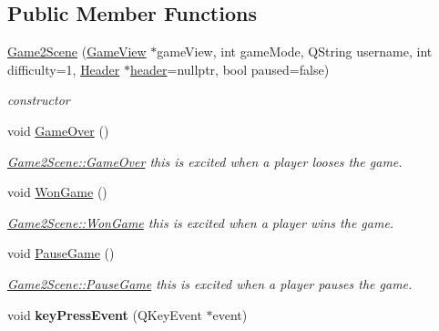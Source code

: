 \subsection*{Public Member Functions}
\begin{DoxyCompactItemize}
\item 
\hyperlink{classGame2Scene_a3e7775376b16bb0e7870b4a4ebe50b06}{Game2\-Scene} (\hyperlink{classGameView}{Game\-View} $\ast$game\-View, int game\-Mode, Q\-String username, int difficulty=1, \hyperlink{classHeader}{Header} $\ast$\hyperlink{classGame2Scene_ab20468619c00df91ed73eb1cce3ce5cf}{header}=nullptr, bool paused=false)
\begin{DoxyCompactList}\small\item\em constructor \end{DoxyCompactList}\item 
\hypertarget{classGame2Scene_a244be25736db0fe9b4525c627e2a5927}{void \hyperlink{classGame2Scene_a244be25736db0fe9b4525c627e2a5927}{Game\-Over} ()}\label{classGame2Scene_a244be25736db0fe9b4525c627e2a5927}

\begin{DoxyCompactList}\small\item\em \hyperlink{classGame2Scene_a244be25736db0fe9b4525c627e2a5927}{Game2\-Scene\-::\-Game\-Over} this is excited when a player looses the game. \end{DoxyCompactList}\item 
void \hyperlink{classGame2Scene_a74ad2a4ef08b8bfed2b2634c6da803c8}{Won\-Game} ()
\begin{DoxyCompactList}\small\item\em \hyperlink{classGame2Scene_a74ad2a4ef08b8bfed2b2634c6da803c8}{Game2\-Scene\-::\-Won\-Game} this is excited when a player wins the game. \end{DoxyCompactList}\item 
void \hyperlink{classGame2Scene_a5016fa1e0f3dae92ef399f35aae368f3}{Pause\-Game} ()
\begin{DoxyCompactList}\small\item\em \hyperlink{classGame2Scene_a5016fa1e0f3dae92ef399f35aae368f3}{Game2\-Scene\-::\-Pause\-Game} this is excited when a player pauses the game. \end{DoxyCompactList}\item 
\hypertarget{classGame2Scene_ac9de3cff4a4c70508704cfc331b95b73}{void {\bfseries key\-Press\-Event} (Q\-Key\-Event $\ast$event)}\label{classGame2Scene_ac9de3cff4a4c70508704cfc331b95b73}


\end{DoxyCompactItemize}
